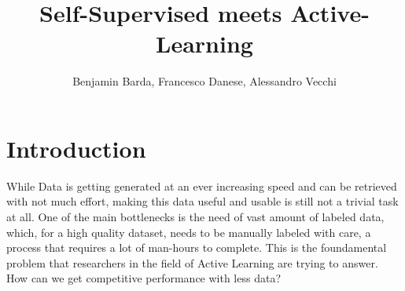 \documentclass{article}
\begin{document}
\author{Benjamin Barda, Francesco Danese, Alessandro Vecchi}
\title{\vspace{-2cm}\textbf{Self-Supervised meets Active-Learning}}
\maketitle

\section*{Introduction}
\begin{flushleft}
While Data is getting generated at an ever increasing speed and can be retrieved with not much effort,
making this data useful and usable is still not a trivial task at all.
One of the main bottlenecks is the need of vast amount of labeled data, which, for a high quality dataset,
needs to be manually labeled with care, a process that requires a lot of man-hours to complete. 
This is the foundamental problem that researchers in the field of Active Learning are trying to answer. 
How can we get competitive performance with less data?
\end{flushleft}
\end{document}
